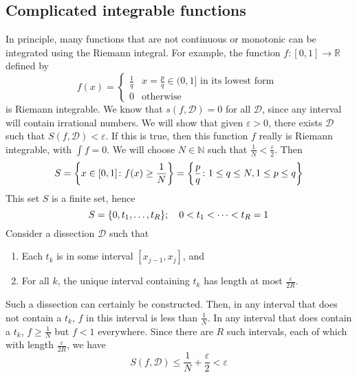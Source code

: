 \subsection{Complicated integrable functions}
In principle, many functions that are not continuous or monotonic can be integrated using the Riemann integral.
For example, the function \(f\colon [0, 1] \to \mathbb R\) defined by
\[
	f(x) = \begin{cases}
		\frac{1}{q} & x = \frac{p}{q} \in (0, 1] \text{ in its lowest form } \\
		0           & \text{otherwise}
	\end{cases}
\]
is Riemann integrable.
We know that \(s(f, \mathcal D) = 0\) for all \(\mathcal D\), since any interval will contain irrational numbers.
We will show that given \(\varepsilon > 0\), there exists \(\mathcal D\) such that \(S(f, \mathcal D) < \varepsilon\).
If this is true, then this function \(f\) really is Riemann integrable, with \(\int f = 0\).
We will choose \(N \in \mathbb N\) such that \(\frac{1}{N} < \frac{\varepsilon}{2}\).
Then
\[
	S = \qty{ x \in [0, 1] \colon f(x) \geq \frac{1}{N} } = \qty{ \frac{p}{q} \colon 1 \leq q \leq N, 1 \leq p \leq q }
\]
This set \(S\) is a finite set, hence
\[
	S = \qty{ 0, t_1, \dots, t_R };\quad 0 < t_1 < \dots < t_R = 1
\]
Consider a dissection \(\mathcal D\) such that
\begin{enumerate}[(1)]
	\item Each \(t_k\) is in some interval \([x_{j-1}, x_j]\), and
	\item For all \(k\), the unique interval containing \(t_k\) has length at most \(\frac{\varepsilon}{2R}\).
\end{enumerate}
Such a dissection can certainly be constructed.
Then, in any interval that does not contain a \(t_k\), \(f\) in this interval is less than \(\frac{1}{N}\).
In any interval that does contain a \(t_k\), \(f \geq \frac{1}{N}\) but \(f < 1\) everywhere.
Since there are \(R\) such intervals, each of which with length \(\frac{\varepsilon}{2R}\), we have
\[
	S(f, \mathcal D) \leq \frac{1}{N} + \frac{\varepsilon}{2} < \varepsilon
\]

